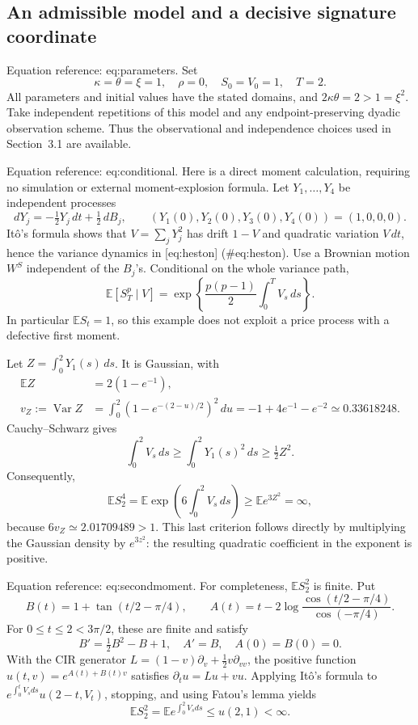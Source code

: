 \documentclass[10pt]{article}
\begin{document}
\subsection*{An admissible model and a decisive signature coordinate}
Equation reference: eq:parameters. Set \[
 \kappa=\theta=\xi=1,\quad \rho=0,\quad S_0=V_0=1,\quad T=2 .\] All parameters and initial values have the stated domains, and \(2\kappa\theta=2>1=\xi^2\). Take independent repetitions of this model and any endpoint-preserving dyadic observation scheme. Thus the observational and independence choices used in Section 3.1 are available.\par
Equation reference: eq:conditional. Here is a direct moment calculation, requiring no simulation or external moment-explosion formula. Let \(Y_1,\ldots,Y_4\) be independent processes \[dY_j=-\tfrac12 Y_j\,dt+\tfrac12\,dB_j,\qquad
 (Y_1(0),Y_2(0),Y_3(0),Y_4(0))=(1,0,0,0).\] Itô’s formula shows that \(V=\sum_jY_j^2\) has drift \(1-V\) and quadratic variation \(V\,dt\), hence the variance dynamics in [eq:heston] (\#eq:heston). Use a Brownian motion \(W^S\) independent of the \(B_j\)’s. Conditional on the whole variance path, \[
 \mathbb E[S_T^p\mid V]
 =\exp\left\{\frac{p(p-1)}2\int_0^T V_s\,ds\right\}.\] In particular \(\mathbb ES_t=1\), so this example does not exploit a price process with a defective first moment.\par
Let \(Z=\int_0^2Y_1(s)\,ds\). It is Gaussian, with \[\begin{aligned}
 \mathbb EZ&=2(1-e^{-1}),\\
 v_Z:=\operatorname{Var}Z
 &=\int_0^2(1-e^{-(2-u)/2})^2\,du
   =-1+4e^{-1}-e^{-2}\simeq0.33618248 .\end{aligned}\] Cauchy–Schwarz gives \[\int_0^2 V_s\,ds\ge\int_0^2Y_1(s)^2\,ds\ge \tfrac12 Z^2.\] Consequently, \[\mathbb ES_2^4=\mathbb E\exp\left(6\int_0^2 V_s\,ds\right)
       \ge \mathbb Ee^{3Z^2}=\infty ,\] because \(6v_Z\simeq2.01709489>1\). This last criterion follows directly by multiplying the Gaussian density by \(e^{3z^2}\): the resulting quadratic coefficient in the exponent is positive.\par
Equation reference: eq:secondmoment. For completeness, \(\mathbb ES_2^2\) is finite. Put \[B(t)=1+\tan(t/2-\pi/4),\qquad
 A(t)=t-2\log\frac{\cos(t/2-\pi/4)}{\cos(-\pi/4)} .\] For \(0\le t\le2<3\pi/2\), these are finite and satisfy \[B'=\tfrac12B^2-B+1,\quad A'=B,\quad A(0)=B(0)=0.\] With the CIR generator \(L=(1-v)\partial_v+\tfrac12v\partial_{vv}\), the positive function \(u(t,v)=e^{A(t)+B(t)v}\) satisfies \(\partial_tu=Lu+vu\). Applying Itô’s formula to \(e^{\int_0^t V_sds}u(2-t,V_t)\), stopping, and using Fatou’s lemma yields \[
 \mathbb ES_2^2=\mathbb Ee^{\int_0^2 V_sds}\le u(2,1)<\infty .\]\par
\end{document}
